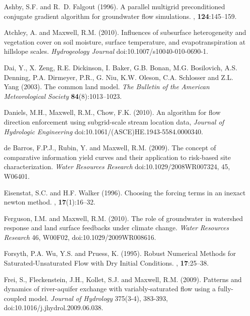 \begin{thebibliography}{99}

Ashby, S.F. and R.~D. Falgout (1996).
\newblock A parallel multigrid preconditioned conjugate gradient algorithm for
  groundwater flow simulations.
, {\bf 124}:145--159.

Atchley, A. and Maxwell, R.M. (2010). Influences of subsurface heterogeneity and vegetation cover on soil moisture, surface temperature, and evapotranspiration at hillslope scales. {\em Hydrogeology Journal} doi:10.1007/s10040-010-0690-1.

Dai, Y., X. Zeng, R.E. Dickinson, I. Baker, G.B. Bonan, M.G. Bosilovich, A.S. Denning, P.A. Dirmeyer, P.R., G. Niu, K.W. Oleson, C.A. Schlosser and Z.L. Yang (2003). The common land model. {\em The Bulletin of the American Meteorological Society} {\bf 84}(8):1013--1023.

Daniels, M.H., Maxwell, R.M., Chow, F.K. (2010). An algorithm for flow direction enforcement using subgrid-scale stream location data, {\em Journal of Hydrologic Engineering} doi:10.1061/(ASCE)HE.1943-5584.0000340.

de Barros, F.P.J., Rubin, Y. and Maxwell, R.M. (2009). The concept of comparative information yield curves and their application to risk-based site characterization. {\em Water Resources Research} doi:10.1029/2008WR007324, 45, W06401.

Eisenstat, S.C. and H.F. Walker (1996).
\newblock Choosing the forcing terms in an inexact newton method.
, {\bf 17}(1):16--32.

Ferguson, I.M. and Maxwell, R.M. (2010). The role of groundwater in watershed response and land surface feedbacks under climate change. {\em Water Resources Research} 46, W00F02, doi:10.1029/2009WR008616.

Forsyth, P.A. Wu, Y.S. and Pruess, K. (1995).
\newblock Robust Numerical Methods for Saturated-Unsaturated Flow with Dry Initial Conditions.
, {\bf 17}:25--38.

Frei, S., Fleckenstein, J.H., Kollet, S.J. and Maxwell, R.M. (2009). Patterns and dynamics of river-aquifer exchange with variably-saturated flow using a fully-coupled model. {\em Journal of Hydrology} 375(3-4), 383-393, doi:10.1016/j.jhydrol.2009.06.038.


\end{thebibliography}

